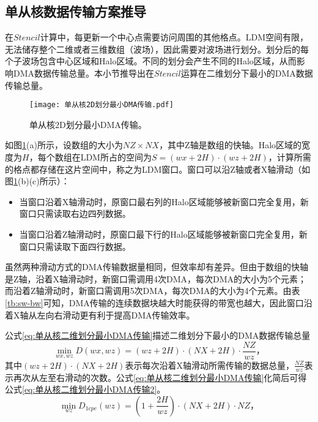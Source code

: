 \subsection{单从核数据传输方案推导}

在$Stencil$计算中，每更新一个中心点需要访问周围的其他格点。LDM空间有限，无法储存整个二维或者三维数组（波场），因此需要对波场进行划分。划分后的每个子波场包含中心区域和Halo区域。不同的划分会产生不同的Halo区域，从而影响DMA数据传输总量。本小节推导出在$Stencil$运算在二维划分下最小的DMA数据传输总量。

\begin{figure}[ht]
  \centering
  \texttt{[image: 单从核2D划分最小DMA传输.pdf]}
  \caption{单从核2D划分最小DMA传输。}
  \label{fig:cpe-2d-derive}
\end{figure}

如图\ref{fig:cpe-2d-derive}(a)所示，设数组的大小为$NZ\times NX$，其中Z轴是数组的快轴。Halo区域的宽度为$H$，每个数组在LDM所占的空间为$S=(wx+2H)\cdot(wz+2H)$，计算所需的格点都存储在这片空间中，称之为LDM窗口。窗口可以沿Z轴或者X轴滑动（如图\ref{fig:cpe-2d-derive}(b)(c)所示）：
\begin{itemize}
  \item 当窗口沿着X轴滑动时，原窗口最右列的Halo区域能够被新窗口完全复用，新窗口只需读取右边四列数据。
  \item 当窗口沿着Z轴滑动时，原窗口最下行的Halo区域能够被新窗口完全复用，新窗口只需读取下面四行数据。
\end{itemize}

虽然两种滑动方式的DMA传输数据量相同，但效率却有差异。但由于数组的快轴是Z轴，沿着X轴滑动时，新窗口需调用4次DMA，每次DMA的大小为5个元素；而沿着Z轴滑动时，新窗口需调用5次DMA，每次DMA的大小为4个元素。由表\ref{tb:sw-bw}可知，DMA传输的连续数据块越大时能获得的带宽也越大，因此窗口沿着X轴从左向右滑动更有利于提高DMA传输效率。

公式\ref{eq:单从核二维划分最小DMA传输}描述二维划分下最小的DMA数据传输总量
\begin{equation}
  \min_{wx,wz} D(wx,wz) = (wz+2H)\cdot(NX+2H)\cdot\frac{NZ}{wz}，
  \label{eq:单从核二维划分最小DMA传输}
\end{equation}
其中$(wz+2H)\cdot(NX+2H)$表示每次沿着X轴滑动所需传输的数据总量，$\frac{NZ}{wz}$表示再次从左至右滑动的次数。公式\ref{eq:单从核二维划分最小DMA传输}化简后可得公式\ref{eq:单从核二维划分最小DMA传输2}。
\begin{equation}
  \min_{wz} D_{1cpe}(wz) = (1+\frac{2H}{wz})\cdot(NX+2H)\cdot NZ，
  \label{eq:单从核二维划分最小DMA传输2}
\end{equation}

